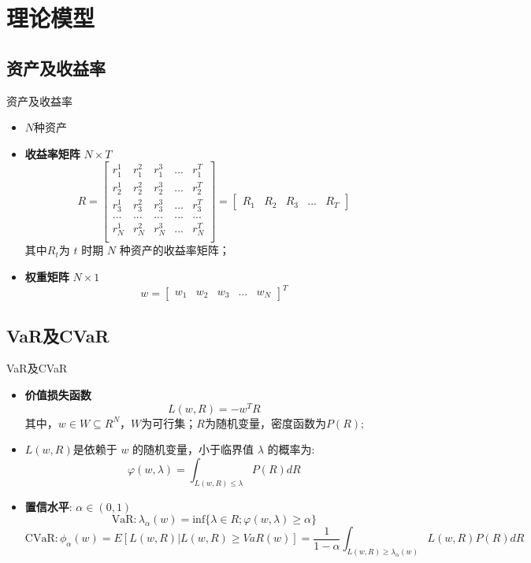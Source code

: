 \documentclass[CJK,aspectratio=169]{beamer}  %
\begin{document}
\section{理论模型}
\subsection{资产及收益率}
\begin{frame}{资产及收益率}
	\begin{itemize}
		\item $N$种资产
		\item \textbf{收益率矩阵} $N\times T$
		$$
		R=
		\begin{bmatrix}
			r_1^1 & r_1^2 & r_1^3 & ... & r_1^T\\
			r_2^1 & r_2^2 & r_2^3 & ... & r_2^T\\
			r_3^1 & r_3^2 & r_3^3 & ... & r_3^T\\
			... & ... & ... & ... & ...\\
			r_N^1 & r_N^2 & r_N^3 & ... & r_N^T\\
		\end{bmatrix}
		=
		\begin{bmatrix}
			R_1 & R_2 & R_3 &... & R_T
		\end{bmatrix}
		$$
		其中$R_t$为 $t$ 时期 $N$ 种资产的收益率矩阵；
		\item \textbf{权重矩阵} $N \times 1$
		$$
		w=\begin{bmatrix}
			w_1 & w_2 & w_3 & ... & w_N
		\end{bmatrix}^T
		$$
	\end{itemize}
	\end{frame}

\subsection{VaR及CVaR}
	\begin{frame}{VaR及CVaR}
	\begin{itemize}
		\item \textbf{价值损失函数}
		$$
		L(w,R)=-w^TR
		$$
		其中，$w\in W\subseteq R^N$，$W$为可行集；$R$为随机变量，密度函数为$P(R)$;
		\item $L(w,R)$是依赖于 $w$ 的随机变量，小于临界值 $\lambda$ 的概率为:
		$$
		\varphi(w,\lambda)=\int_{L(w,R)\leq\lambda}P(R)dR
		$$
		\item \textbf{置信水平}: $\alpha\in(0,1)$
		$$
		\text{VaR}:\lambda_{\alpha}(w)=\text{inf}\{\lambda\in R;\varphi(w,\lambda) \geq \alpha \}
		$$
		$$
		\text{CVaR}:\phi_{\alpha}(w)=E[L(w,R) \vert L(w,R) \geq VaR(w)]=\frac{1}{1-\alpha}\int_{L(w,R)\geq \lambda_{\alpha}(w)}L(w,R)P(R)dR
		$$
	\end{itemize}
	\end{frame}
\end{document}
